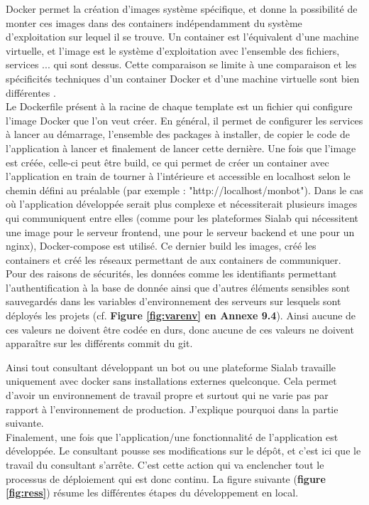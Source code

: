 \documentclass{article} %
\begin{document}
Docker permet la création d'images système spécifique, et donne la possibilité de monter ces images dans des containers indépendamment du système d'exploitation sur lequel il se trouve. Un container est l'équivalent d'une machine virtuelle, et l'image est le système d'exploitation avec l'ensemble des fichiers, services ... qui sont dessus. Cette comparaison se limite à une comparaison et les spécificités techniques d'un container Docker et d'une machine virtuelle sont bien différentes \cite{comp}.\\

Le Dockerfile présent à la racine de chaque template est un fichier qui configure l'image Docker que l'on veut créer. En général, il permet de configurer les services à lancer au démarrage, l'ensemble des packages à installer, de copier le code de l'application à lancer et finalement de lancer cette dernière. Une fois que l'image est créée, celle-ci peut être build, ce qui permet de créer un container avec l'application en train de tourner à l'intérieure et accessible en localhost selon le chemin défini au préalable (par exemple : "http://localhost/monbot"). Dans le cas où l'application développée serait plus complexe et nécessiterait plusieurs images qui communiquent entre elles (comme pour les plateformes Sialab qui nécessitent une image pour le serveur frontend, une pour le serveur backend et une pour un nginx), Docker-compose est utilisé. Ce dernier  build les images, créé les containers et créé les réseaux permettant de aux containers de communiquer. \\

Pour des raisons de sécurités, les données comme les identifiants permettant l'authentification à la base de donnée ainsi que d'autres éléments sensibles sont sauvegardés dans les variables d'environnement des serveurs sur lesquels sont déployés les projets (cf. \textbf{Figure \ref{fig:varenv} en Annexe 9.4}). Ainsi aucune de ces valeurs ne doivent être codée en durs, donc aucune de ces valeurs ne doivent apparaître sur les différents commit du git.

Ainsi tout consultant développant un bot ou une plateforme Sialab travaille uniquement avec docker sans installations externes quelconque. Cela permet d'avoir un environnement de travail propre et surtout qui ne varie pas par rapport à l'environnement de production. J'explique pourquoi dans la partie suivante.\\

Finalement, une fois que l'application/une fonctionnalité de l'application est développée. Le consultant pousse ses modifications sur le dépôt, et c'est ici que le travail du consultant s'arrête. C'est cette action qui va enclencher tout le processus de déploiement qui est donc continu. La figure suivante (\textbf{figure \ref{fig:ress}}) résume les différentes étapes du développement en local.
\end{document}
